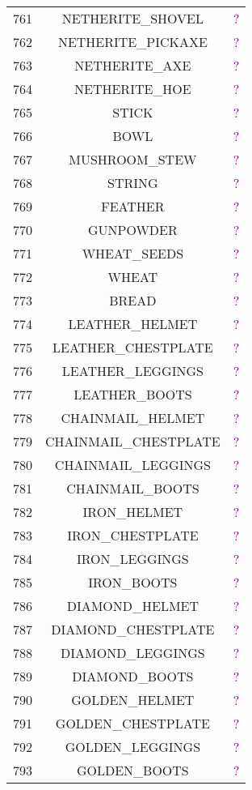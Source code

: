\documentclass[11pt]{article}
\newcommand\myworries[1]{\textcolor{purple}{#1}}
\begin{document}
\begin{longtable}{ |c|c|c| }
	761 & NETHERITE\_SHOVEL & \myworries{?} \\
	762 & NETHERITE\_PICKAXE & \myworries{?} \\
	763 & NETHERITE\_AXE & \myworries{?} \\
	764 & NETHERITE\_HOE & \myworries{?} \\
	765 & STICK & \myworries{?} \\
	766 & BOWL & \myworries{?} \\
	767 & MUSHROOM\_STEW & \myworries{?} \\
	768 & STRING & \myworries{?} \\
	769 & FEATHER & \myworries{?} \\
	770 & GUNPOWDER & \myworries{?} \\
	771 & WHEAT\_SEEDS & \myworries{?} \\
	772 & WHEAT & \myworries{?} \\
	773 & BREAD & \myworries{?} \\
	774 & LEATHER\_HELMET & \myworries{?} \\
	775 & LEATHER\_CHESTPLATE & \myworries{?} \\
	776 & LEATHER\_LEGGINGS & \myworries{?} \\
	777 & LEATHER\_BOOTS & \myworries{?} \\
	778 & CHAINMAIL\_HELMET & \myworries{?} \\
	779 & CHAINMAIL\_CHESTPLATE & \myworries{?} \\
	780 & CHAINMAIL\_LEGGINGS & \myworries{?} \\
	781 & CHAINMAIL\_BOOTS & \myworries{?} \\
	782 & IRON\_HELMET & \myworries{?} \\
	783 & IRON\_CHESTPLATE & \myworries{?} \\
	784 & IRON\_LEGGINGS & \myworries{?} \\
	785 & IRON\_BOOTS & \myworries{?} \\
	786 & DIAMOND\_HELMET & \myworries{?} \\
	787 & DIAMOND\_CHESTPLATE & \myworries{?} \\
	788 & DIAMOND\_LEGGINGS & \myworries{?} \\
	789 & DIAMOND\_BOOTS & \myworries{?} \\
	790 & GOLDEN\_HELMET & \myworries{?} \\
	791 & GOLDEN\_CHESTPLATE & \myworries{?} \\
	792 & GOLDEN\_LEGGINGS & \myworries{?} \\
	793 & GOLDEN\_BOOTS & \myworries{?} \\

\end{longtable}
\end{document}
